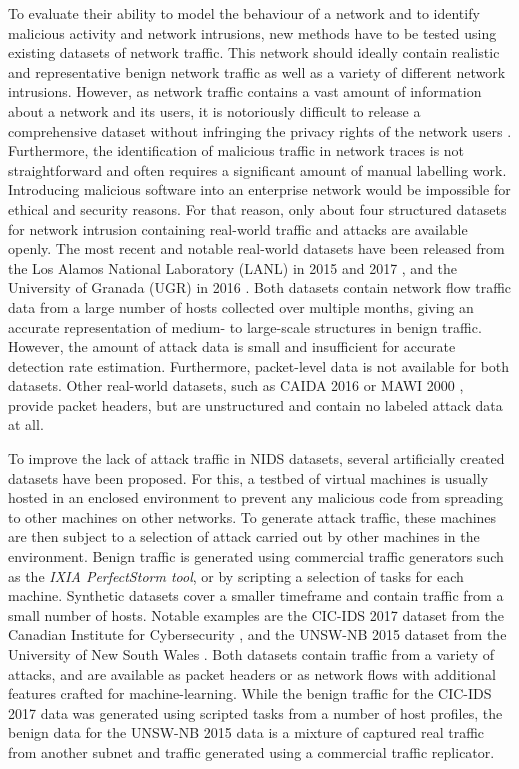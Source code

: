 \documentclass[a4paper,12pt,twoside]{article}
\begin{document}
To evaluate their ability to model the behaviour of a network and to identify malicious activity and network intrusions, new methods have to be tested using existing datasets of network traffic. This network should ideally contain realistic and representative benign network traffic as well as a variety of different network intrusions. However, as network traffic contains a vast amount of information about a network and its users, it is notoriously difficult to release a comprehensive dataset without infringing the privacy rights of the network users \cite{sperotto2009labeled}. Furthermore, the identification of malicious traffic in network traces is not straightforward and often requires a significant amount of manual labelling work. Introducing malicious software into an enterprise network would be impossible for ethical and security reasons. For that reason, only about four structured datasets for network intrusion containing real-world traffic and attacks are available openly. The most recent and notable real-world datasets have been released from the Los Alamos National Laboratory (LANL) in 2015 and 2017 \cite{akent-2015-enterprise-data, turcotte17}, and the University of Granada (UGR) in 2016 \cite{macia2018ugr}. Both datasets contain network flow traffic data from a large number of hosts collected over multiple months, giving an accurate representation of medium- to large-scale structures in benign traffic. However, the amount of attack data is small and insufficient for accurate detection rate estimation. Furthermore, packet-level data is not available for both datasets. Other real-world datasets, such as CAIDA 2016 \cite{walsworth2015caida} or MAWI 2000 \cite{sony2000traffic}, provide packet headers, but are unstructured and contain no labeled attack data at all.

To improve the lack of attack traffic in NIDS datasets, several artificially created datasets have been proposed. For this, a testbed of virtual machines is usually hosted in an enclosed environment to prevent any malicious code from spreading to other machines on other networks. To generate attack traffic, these machines are then subject to a selection of attack carried out by other machines in the environment. Benign traffic is generated using commercial traffic generators such as the \emph{IXIA PerfectStorm tool}, or by scripting a selection of tasks for each machine. Synthetic datasets cover a smaller timeframe and contain traffic from a small number of hosts. Notable examples are the CIC-IDS 2017 dataset from the Canadian Institute for Cybersecurity \cite{sharafaldin2018towards}, %
and the UNSW-NB 2015 dataset from the University of New South Wales \cite{moustafa_unsw-nb15:_2015}. Both datasets contain traffic from a variety of attacks, and are available as packet headers or as network flows with additional features crafted for machine-learning. While the benign traffic for the CIC-IDS 2017 data was generated using scripted tasks from a number of host profiles, the benign data for the UNSW-NB 2015 data is a mixture of captured real traffic from another subnet and traffic generated using a commercial traffic replicator. 
\end{document}
